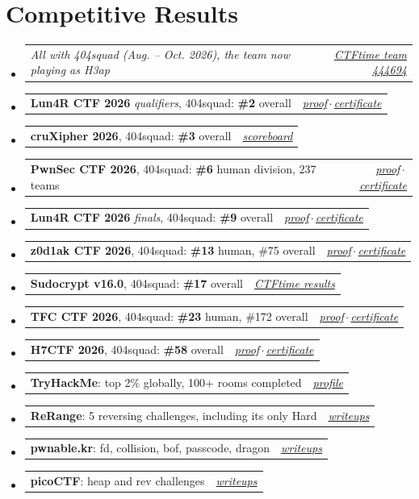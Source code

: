 \documentclass[letterpaper,11pt]{article}
\makeatletter
\newcommand{\resumeEntry}[2]{%
  \item
  \begin{tabular*}{\linewidth}{@{}l@{\extracolsep{\fill}}r@{}}
    #1 & \textit{\small #2} \\
  \end{tabular*}\vspace{-6pt}%
}
\newcommand{\resumeSubHeadingListStart}{\begin{itemize}[leftmargin=0.15in, label={}]}
\newcommand{\resumeSubHeadingListEnd}{\end{itemize}}
\makeatother
\begin{document}
\section{Competitive Results}
  \resumeSubHeadingListStart
    \resumeEntry{\small\textit{All with 404squad (Aug. -- Oct. 2026), the team now playing as H3ap}}{\href{https://ctftime.org/team/444694}{CTFtime team 444694}}
    \resumeEntry{\textbf{Lun4R CTF 2026} \emph{qualifiers}, 404squad: \textbf{\#2} overall}{\href{https://github.com/aaadarsh1337/cybersecurity-achievements/tree/main/Lun4R-quals}{proof}\,$\cdot$\,\href{https://github.com/aaadarsh1337/cybersecurity-achievements/blob/main/Lun4R-quals/LUN4R_CTF_2026_Certificate_Adarsh_Pillai.jpg}{certificate}}
    \resumeEntry{\textbf{cruXipher 2026}, 404squad: \textbf{\#3} overall}{\href{https://github.com/aaadarsh1337/cybersecurity-achievements/blob/main/cruXipher.webp}{scoreboard}}
    \resumeEntry{\textbf{PwnSec CTF 2026}, 404squad: \textbf{\#6} human division, 237 teams}{\href{https://github.com/aaadarsh1337/cybersecurity-achievements/tree/main/PwnSec}{proof}\,$\cdot$\,\href{https://github.com/aaadarsh1337/cybersecurity-achievements/blob/main/PwnSec/006_404squad.pdf}{certificate}}
    \resumeEntry{\textbf{Lun4R CTF 2026} \emph{finals}, 404squad: \textbf{\#9} overall}{\href{https://github.com/aaadarsh1337/cybersecurity-achievements/tree/main/Lun4R-finals}{proof}\,$\cdot$\,\href{https://github.com/aaadarsh1337/cybersecurity-achievements/blob/main/Lun4R-finals/Adarsh\%20Pillai\%20(404squad).pdf}{certificate}}
    \resumeEntry{\textbf{z0d1ak CTF 2026}, 404squad: \textbf{\#13} human, \#75 overall}{\href{https://github.com/aaadarsh1337/cybersecurity-achievements/tree/main/z0d1ak-ctf}{proof}\,$\cdot$\,\href{https://github.com/aaadarsh1337/cybersecurity-achievements/blob/main/z0d1ak-ctf/z0d1ak-certificate-adarsh-pillai.pdf}{certificate}}
    \resumeEntry{\textbf{Sudocrypt v16.0}, 404squad: \textbf{\#17} overall}{\href{https://ctftime.org/event/3443}{CTFtime results}}
    \resumeEntry{\textbf{TFC CTF 2026}, 404squad: \textbf{\#23} human, \#172 overall}{\href{https://github.com/aaadarsh1337/cybersecurity-achievements/tree/main/TFCCTF}{proof}\,$\cdot$\,\href{https://github.com/aaadarsh1337/cybersecurity-achievements/blob/main/TFCCTF/tfc-ctf-26-diploma-adarsh-pillai.png}{certificate}}
    \resumeEntry{\textbf{H7CTF 2026}, 404squad: \textbf{\#58} overall}{\href{https://github.com/aaadarsh1337/cybersecurity-achievements/tree/main/H7CTF}{proof}\,$\cdot$\,\href{https://github.com/aaadarsh1337/cybersecurity-achievements/blob/main/H7CTF/certificate_H7CTF26-46VN-V3V2-32HK.png}{certificate}}
    \resumeEntry{\textbf{TryHackMe}: top 2\% globally, 100+ rooms completed}{\href{https://tryhackme.com/p/aaadarsh1337}{profile}}
    \resumeEntry{\textbf{ReRange}: 5 reversing challenges, including its only Hard}{\href{https://aaadarsh1337.github.io/writeups/?platform=ReRange}{writeups}}
    \resumeEntry{\textbf{pwnable.kr}: fd, collision, bof, passcode, dragon}{\href{https://aaadarsh1337.github.io/writeups/?platform=pwnable.kr}{writeups}}
    \resumeEntry{\textbf{picoCTF}: heap and rev challenges}{\href{https://aaadarsh1337.github.io/writeups/?platform=picoCTF}{writeups}}
  \resumeSubHeadingListEnd\vspace{4pt}
\end{document}
